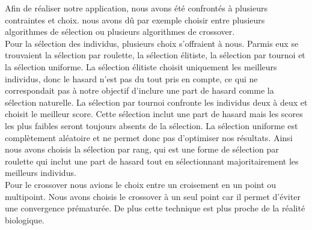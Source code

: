 \documentclass[a4paper,11pt]{article}
\begin{document}
			Afin de réaliser notre application, nous avons été confrontés à plusieurs contraintes et choix. nous avons dû par exemple choisir entre plusieurs algorithmes de sélection ou plusieurs algorithmes de crossover.\\
			Pour la sélection des individus, plusieurs choix s’offraient à nous. Parmis eux se trouvaient la sélection par roulette, la sélection élitiste, la sélection par tournoi et la sélection uniforme.
			La sélection élitiste choisit uniquement les meilleurs individus, donc le hasard n’est pas du tout pris en compte, ce qui ne correspondait pas à notre objectif d’inclure une part de hasard comme la sélection naturelle.
			La sélection par tournoi confronte les individus deux à deux et choisit le meilleur score.
			Cette sélection inclut une part de hasard mais les scores les plus faibles seront toujours absents de la sélection.
			La sélection uniforme est complètement aléatoire et ne permet donc pas d’optimiser nos résultats.
			Ainsi nous avons choisis la sélection par rang, qui est une forme de sélection par roulette qui inclut une part de hasard tout en sélectionnant majoritairement les meilleurs individus.\\
			Pour le crossover nous avions le choix entre un croisement en un point ou multipoint.
			Nous avons choisis le crossover à un seul point car il permet d’éviter une convergence prématurée. De plus cette technique est plus proche de la réalité biologique.
\end{document}
